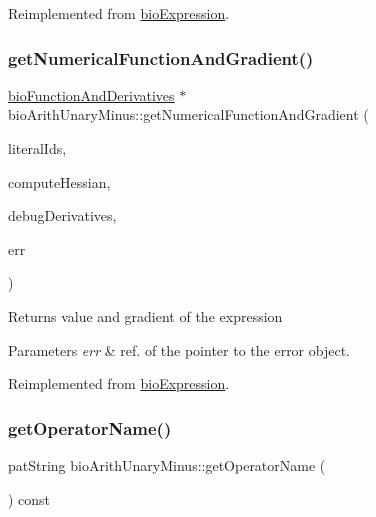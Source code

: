 Reimplemented from \hyperlink{classbio_expression_a3e4b4dca58dbbc6f0e411b30eb3f60b4}{bio\+Expression}.

\mbox{\label{classbio_arith_unary_minus_a8fc3f51f45b38f8e710db12eec18b9fb}} 
\subsubsection{\texorpdfstring{get\+Numerical\+Function\+And\+Gradient()}{getNumericalFunctionAndGradient()}}
{\footnotesize\ttfamily \hyperlink{classbio_function_and_derivatives}{bio\+Function\+And\+Derivatives} $\ast$ bio\+Arith\+Unary\+Minus\+::get\+Numerical\+Function\+And\+Gradient (\begin{DoxyParamCaption}\item[{vector$<$ pat\+U\+Long $>$}]{literal\+Ids,  }\item[{pat\+Boolean}]{compute\+Hessian,  }\item[{pat\+Boolean}]{debug\+Derivatives,  }\item[{pat\+Error $\ast$\&}]{err }\end{DoxyParamCaption})\hspace{0.3cm}{\ttfamily [virtual]}}

\begin{DoxyReturn}{Returns}
value and gradient of the expression 
\end{DoxyReturn}

\begin{DoxyParams}{Parameters}
{\em err} & ref. of the pointer to the error object. \\
\hline
\end{DoxyParams}


Reimplemented from \hyperlink{classbio_expression_a91c81ce80c9e972c913b10f5f3c1ed13}{bio\+Expression}.

\mbox{\label{classbio_arith_unary_minus_a59b3bcf198b25bc802775014bfce2f21}} 
\subsubsection{\texorpdfstring{get\+Operator\+Name()}{getOperatorName()}}
{\footnotesize\ttfamily pat\+String bio\+Arith\+Unary\+Minus\+::get\+Operator\+Name (\begin{DoxyParamCaption}{ }\end{DoxyParamCaption}) const\hspace{0.3cm}{\ttfamily [virtual]}}


